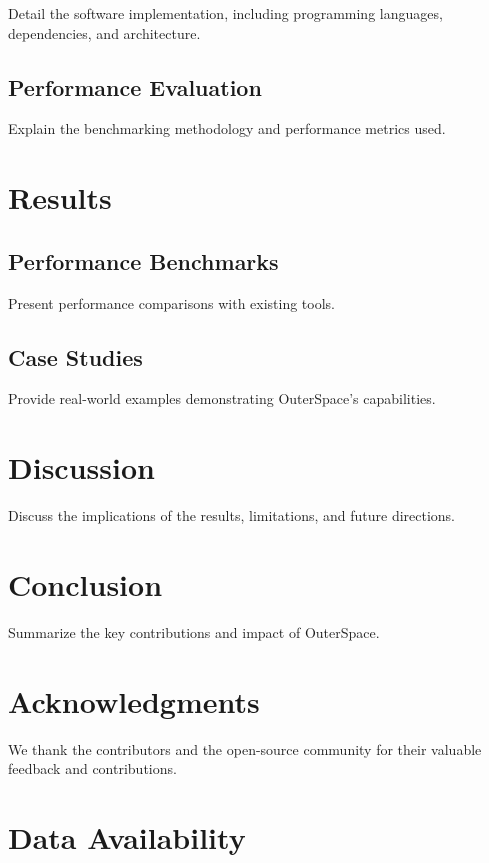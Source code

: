 \documentclass[9pt,twocolumn,twoside]{extarticle}
\begin{document}
Detail the software implementation, including programming languages, dependencies, and architecture.

\subsection{Performance Evaluation}

Explain the benchmarking methodology and performance metrics used.

\section{Results}

\subsection{Performance Benchmarks}

Present performance comparisons with existing tools.

\subsection{Case Studies}

Provide real-world examples demonstrating OuterSpace's capabilities.

\section{Discussion}

Discuss the implications of the results, limitations, and future directions.

\section{Conclusion}

Summarize the key contributions and impact of OuterSpace.

\section*{Acknowledgments}

We thank the contributors and the open-source community for their valuable feedback and contributions.

\section*{Data Availability}
\end{document}
